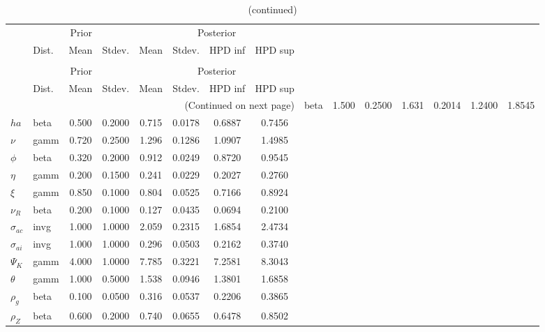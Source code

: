  
\begin{center}
\begin{longtable}{llcccccc} 
\caption{Results from Metropolis-Hastings (parameters)}
 \label{Table:MHPosterior:1}\\
\toprule 
  & \multicolumn{3}{c}{Prior}  &  \multicolumn{4}{c}{Posterior} \\
  \cmidrule(r{.75em}){2-4} \cmidrule(r{.75em}){5-8}
  & Dist. & Mean  & Stdev. & Mean & Stdev. & HPD inf & HPD sup\\
\midrule \endfirsthead 
\caption{(continued)}\\\toprule 
  & \multicolumn{3}{c}{Prior}  &  \multicolumn{4}{c}{Posterior} \\
  \cmidrule(r{.75em}){2-4} \cmidrule(r{.75em}){5-8}
  & Dist. & Mean  & Stdev. & Mean & Stdev. & HPD inf & HPD sup\\
\midrule \endhead 
\bottomrule \multicolumn{8}{r}{(Continued on next page)} \endfoot 
\bottomrule \endlastfoot 
${\sigma}$ & beta &   1.500 & 0.2500 &   1.631& 0.2014 &  1.2400 &  1.8545 \\ 
${ha}$ & beta &   0.500 & 0.2000 &   0.715& 0.0178 &  0.6887 &  0.7456 \\ 
$\nu$ & gamm &   0.720 & 0.2500 &   1.296& 0.1286 &  1.0907 &  1.4985 \\ 
${\phi}$ & beta &   0.320 & 0.2000 &   0.912& 0.0249 &  0.8720 &  0.9545 \\ 
${\eta}$ & gamm &   0.200 & 0.1500 &   0.241& 0.0229 &  0.2027 &  0.2760 \\ 
$\xi$ & gamm &   0.850 & 0.1000 &   0.804& 0.0525 &  0.7166 &  0.8924 \\ 
${\nu_R}$ & beta &   0.200 & 0.1000 &   0.127& 0.0435 &  0.0694 &  0.2100 \\ 
${\sigma_{ac}}$ & invg &   1.000 & 1.0000 &   2.059& 0.2315 &  1.6854 &  2.4734 \\ 
${\sigma_{ai}}$ & invg &   1.000 & 1.0000 &   0.296& 0.0503 &  0.2162 &  0.3740 \\ 
${\Psi_{K}}$ & gamm &   4.000 & 1.0000 &   7.785& 0.3221 &  7.2581 &  8.3043 \\ 
${\theta}$ & gamm &   1.000 & 0.5000 &   1.538& 0.0946 &  1.3801 &  1.6858 \\ 
${\rho_g}$ & beta &   0.100 & 0.0500 &   0.316& 0.0537 &  0.2206 &  0.3865 \\ 
${\rho_Z}$ & beta &   0.600 & 0.2000 &   0.740& 0.0655 &  0.6478 &  0.8502 \\ 

\end{longtable}
\end{center}
